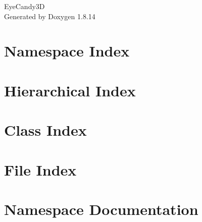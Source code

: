 \documentclass[twoside]{book}
\newcommand{\+}{\discretionary{\mbox{\scriptsize$\hookleftarrow$}}{}{}}
\newcommand{\clearemptydoublepage}{%
  \newpage{\pagestyle{empty}\cleardoublepage}%
}
\begin{document}
\hypersetup{pageanchor=false,
             bookmarksnumbered=true,
             pdfencoding=unicode
            }
\begin{titlepage}
\vspace*{7cm}
\begin{center}%
{\Large Eye\+Candy3D }\\
\vspace*{1cm}
{\large Generated by Doxygen 1.8.14}\\
\end{center}
\end{titlepage}
\clearemptydoublepage
{}
\tableofcontents
\clearemptydoublepage
{}
\hypersetup{pageanchor=true}

\chapter{Namespace Index}

\chapter{Hierarchical Index}

\chapter{Class Index}

\chapter{File Index}

\chapter{Namespace Documentation}





\end{document}
